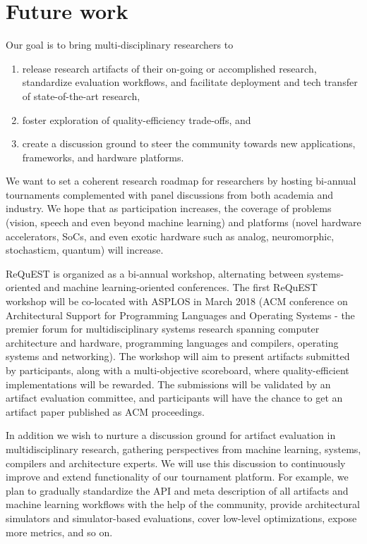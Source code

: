 \documentclass[10pt,letterpaper,twocolumn]{article}
\begin{document}
\section{Future work}

Our goal is to bring multi-disciplinary researchers to 
\begin{enumerate}
  \item release research artifacts of their on-going or accomplished research,
standardize evaluation workflows, and facilitate deployment
and tech transfer of state-of-the-art research,
  \item foster exploration of quality-efficiency trade-offs, and 
  \item create a discussion ground to steer the community towards new
applications, frameworks, and hardware platforms.
\end{enumerate}

We want to set a coherent research roadmap for
researchers by hosting bi-annual tournaments complemented with
panel discussions from both academia and industry. We hope
that as participation increases, the coverage of problems
(vision, speech and even beyond machine learning) and
platforms (novel hardware accelerators, SoCs, and even exotic
hardware such as analog, neuromorphic, stochasticm, quantum) will increase.

ReQuEST is organized as a bi-annual workshop, alternating
between systems-oriented and machine learning-oriented
conferences. The first ReQuEST workshop will be co-located
with ASPLOS in March 2018 (ACM conference on Architectural Support for Programming Languages and Operating Systems 
- the premier forum for multidisciplinary systems research spanning computer architecture 
and hardware, programming languages and compilers, operating systems and networking).
The workshop will aim to present
artifacts submitted by participants, along with
a multi-objective scoreboard, where quality-efficient
implementations will be rewarded. 
The submissions will be validated by an artifact evaluation committee, 
and participants will have the chance to get an artifact paper
published as ACM proceedings. 

In addition we wish to nurture
a discussion ground for artifact evaluation in multidisciplinary
research, gathering perspectives from machine learning,
systems, compilers and architecture experts. 
%
We will use this discussion to continuously improve and extend 
functionality of our tournament platform.
%
For example, we plan to gradually standardize the API and meta description of all artifacts 
and machine learning workflows with the help of the community, 
provide architectural simulators and simulator-based evaluations, 
cover low-level optimizations, expose more metrics, and so on. 
\end{document}
